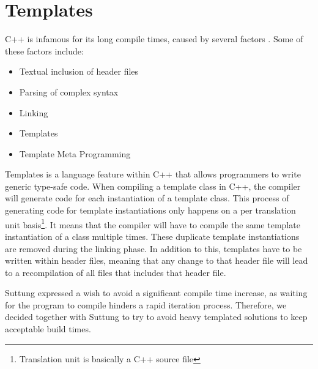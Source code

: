 \section{Templates}
\label{sec:requirements_templates}
C++ is infamous for its long compile times, caused by several factors
\cite{stack_overflow_why_does_cpp_compilation_take_so_long}.
Some of these factors include:
\begin{itemize}
    \item
    Textual inclusion of header files

    \item
    Parsing of complex syntax

    \item
    Linking

    \item
    Templates

    \item
    Template Meta Programming
\end{itemize}

Templates is a language feature within C++ that allows programmers to write generic type-safe code.
When compiling a template class in C++, the compiler will generate code for each instantiation of a template class.
This process of generating code for template instantiations only happens on a per translation unit basis\footnote{Translation unit is basically a C++ source file}.
It means that the compiler will have to compile the same template instantiation of a class multiple times.
These duplicate template instantiations are removed during the linking phase.
In addition to this, templates have to be written within header files,
meaning that any change to that header file will lead to a recompilation of all files that includes that header file\cite{dr_dobbs_cpp_compilation_speed}.

Suttung expressed a wish to avoid a significant compile time increase, as waiting for the program to compile hinders a rapid iteration process.
Therefore, we decided together with Suttung to try to avoid heavy templated solutions to keep acceptable build times.

